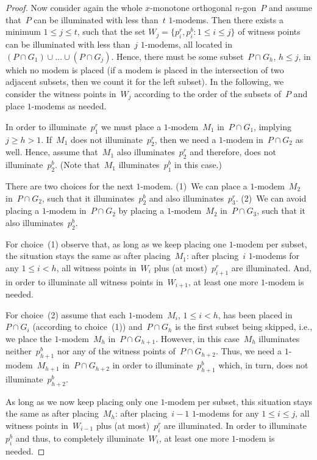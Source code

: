 \documentclass[A4]{article}
\begin{document}
\begin{proof}
Now consider again the whole $x$-monotone orthogonal $n$-gon~$P$ and assume that~$P$ can be illuminated with less than~$t$ \mbox{$1$-modems}. 
Then there exists a minimum $1 \leq j \leq t$, such that the set $W_j = \{p^r_i, p^b_i : 1 \leq i \leq j\}$ of witness points can be illuminated with less than~$j$ \mbox{$1$-modems}, all located in $(P\cap G_1) \cup \ldots \cup (P\cap G_{j})$. 
Hence, there must be some subset~$P\cap G_h$, $h \leq j$, in which no modem is placed (if a modem is placed in the intersection of two adjacent subsets, then we count it for the left subset).
In the following, we consider the witness points in~$W_j$ according to the order of the subsets of~$P$ and place \mbox{$1$-modems} as needed.
	
In order to illuminate~$p^r_1$ we must place a \mbox{$1$-modem}~$M_1$ in~$P\cap G_1$, implying $j\geq h>1$.
If~$M_1$ does not illuminate~$p^r_2$, then we need a \mbox{$1$-modem} in~$P\cap G_2$ as well. 
Hence, assume that~$M_1$ also illuminates~$p^r_2$ and therefore, does not illuminate~$p^b_2$.
(Note that~$M_1$ illuminates~$p^b_1$ in this case.)

There are two choices for the next \mbox{$1$-modem}.
(1)~We can place a \mbox{$1$-modem}~$M_2$ in~$P\cap G_2$, such that it illuminates~$p^b_2$ and also illuminates~$p^r_3$.
(2)~We can avoid placing a \mbox{$1$-modem} in~$P\cap G_2$ by placing a \mbox{$1$-modem}~$M_2$ in~$P\cap G_3$, such that it also illuminates~$p^b_2$.

For choice~(1) observe that, as long as we keep placing one \mbox{$1$-modem} per subset, the situation stays the same as after placing~$M_1$:
after placing~$i$ \mbox{$1$-modems} for any $1\leq i < h$, all witness points in~$W_{i}$ plus (at most)~$p^r_{i+1}$ are illuminated.
And, in order to illuminate all witness points in~$W_{i+1}$, at least one more \mbox{$1$-modem} is needed.

For choice~(2) assume that each \mbox{$1$-modem}~$M_i$, $1\leq i<h$, has been placed in~$P\cap G_i$ (according to choice~(1)) and~$P\cap G_h$ is the first subset being skipped, i.e., we place the \mbox{$1$-modem}~$M_h$ in~$P\cap G_{h+1}$.
However, in this case~$M_h$ illuminates neither~$p^b_{h+1}$ nor any of the witness points of~$P\cap G_{h+2}$.
Thus, we need a \mbox{$1$-modem}~$M_{h+1}$ in~$P\cap G_{h+2}$ in order to illuminate~$p^b_{h+1}$ which, in turn, does not illuminate~$p^b_{h+2}$.

As long as we now keep placing only one \mbox{$1$-modem} per subset, this situation stays the same as after placing~$M_h$:
after placing~\mbox{$i\!-\!1$} \mbox{$1$-modems} for any $1\leq i\leq j$, all witness points in~$W_{i-1}$ plus (at most)~$p^r_{i}$ are illuminated.
In order to illuminate~$p^b_{i}$ and thus, to completely illuminate~$W_{i}$, at least one more \mbox{$1$-modem} is needed.


\end{proof}
\end{document}
